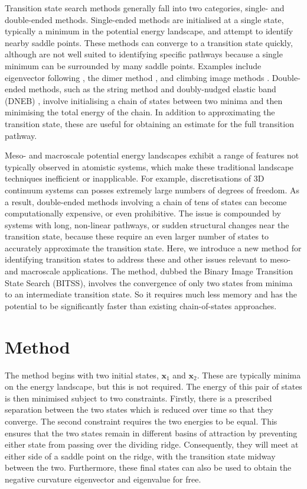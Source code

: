 \documentclass[aps,twocolumn]{revtex4}
\begin{document}
Transition state search methods generally fall into two categories, single- and double-ended methods.
Single-ended methods are initialised at a single state, typically a minimum in the potential energy landscape, and attempt to identify nearby saddle points. These methods can converge to a transition state quickly, although are not well suited to identifying specific pathways because a single minimum can be surrounded by many saddle points. Examples include eigenvector following \cite{Cerjan1981}, the dimer method \cite{Heyden2005,Kastner2008}, and climbing image methods \cite{E2007,Ren2013}.
Double-ended methods, such as the string method \cite{E2002,E2007} and doubly-nudged elastic band (DNEB) \cite{Trygubenko2004}, involve initialising a chain of states between two minima and then minimising the total energy of the chain. In addition to approximating the transition state, these are useful for obtaining an estimate for the full transition pathway.

Meso- and macroscale potential energy landscapes exhibit a range of features not typically observed in atomistic systems, which make these traditional landscape techniques inefficient or inapplicable. For example, discretisations of 3D continuum systems can posses extremely large numbers of degrees of freedom. As a result, double-ended methods involving a chain of tens of states can become computationally expensive, or even prohibitive. The issue is compounded by systems with long, non-linear pathways, or sudden structural changes near the transition state, because these require an even larger number of states to accurately approximate the transition state. Here, we introduce a new method for identifying transition states to address these and other issues relevant to meso- and macroscale applications. The method, dubbed the Binary Image Transition State Search (BITSS), involves the convergence of only two states from minima to an intermediate transition state. So it requires much less memory and has the potential to be significantly faster than existing chain-of-states approaches.


\section{Method}
The method begins with two initial states, $\bm{x}_1$ and $\bm{x}_2$. These are typically minima on the energy landscape, but this is not required. The energy of this pair of states is then minimised subject to two constraints. Firstly, there is a prescribed separation between the two states which is reduced over time so that they converge. The second constraint requires the two energies to be equal. This ensures that the two states remain in different basins of attraction by preventing either state from passing over the dividing ridge. Consequently, they will meet at either side of a saddle point on the ridge, with the transition state midway between the two. Furthermore, these final states can also be used to obtain the negative curvature eigenvector and eigenvalue for free.
\end{document}
